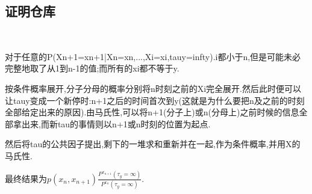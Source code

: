 \documentclass[a4paper,oneside]{ctexbook}
\begin{document}
	\subsection{证明仓库}

		\begin{pf}[木师姐的证明]
			\label{mu}
			\ 

			对于任意的P(Xn+1=xn+1|Xn=xn,...,Xi=xi,tauy=infty).i都小于n,但是可能未必完整地取了从1到n-1的值;而所有的xi都不等于y.

			按条件概率展开,分子分母的概率分别将n时刻之前的Xi完全展开.然后此时便可以让tauy变成一个新停时:n+1之后的时间首次到y(这就是为什么要把n及之前的时刻全部给定出来的原因).由马氏性,可以将n+1(分子上)或n(分母上)之前时候的信息全部拿出来,而新tau的事情则以n+1或n时刻的位置为起点.

			然后将tau的公共因子提出,剩下的一堆求和重新并在一起,作为条件概率,并用X的马氏性.

			最终结果为$p(x_n,x_{n+1})\displaystyle\frac
			{P^{x_{n+1}}(\tau_y=\infty)}
			{P^{x_{n}}(\tau_y=\infty)}$.

		\end{pf}
\end{document}

